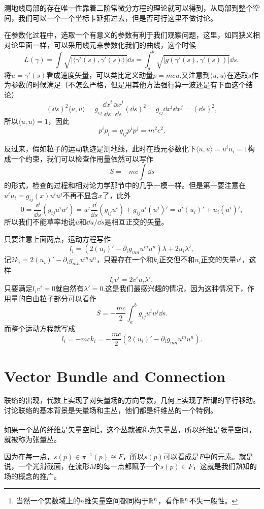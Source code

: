 测地线局部的存在唯一性靠着二阶常微分方程的理论就可以得到，从局部到整个空间，我们可以一个一个坐标卡延拓过去，但是否可行这里不做讨论。

在参数化过程中，选取一个有意义的参数有利于我们观察问题，这里，如同狭义相对论里面一样，可以采用线元来参数化我们的曲线，这个时候
\[
	L(\gamma)=\int \sqrt{|\langle\gamma'(s),\gamma'(s)\rangle|}\dd s=\int_a^b \sqrt{|g(\gamma'(s),\gamma'(s))|}\dd s,
\]
将$u=\gamma'(s)$看成速度矢量，可以类比定义动量$p=mcu$.又注意到$\langle u,u\rangle$在选取$s$作为参数的时候满足（不怎么严格，但是用其他方法强行算一波还是有下面这个结论）
\[
	(\dd s)^2\langle u, u\rangle=g_{ij}\frac{\dd x^i}{\dd s}\frac{\dd x^j}{\dd s}(\dd s)^2=g_{ij}\dd x^i\dd x^j=(\dd s)^2,
\]
所以$\langle u, u\rangle=1$，因此
\[
	p^ip_i=g_{ij}p^i p^j=m^2c^2.
\]

反过来，假如粒子的运动轨迹是测地线，此时在线元参数化下$\langle u,u\rangle=u^iu_i=1$构成一个约束，我们可以检查作用量依然可以写作
\[
	S=-mc \int \dd s
\]
的形式，检查的过程和相对论力学那节中的几乎一模一样。但是第一要注意在$u^i u_i=g_{ij}(x) u^i u^j$不再不显含$x$了，此外
\[
	0=\frac{\dd}{\dd s}\left(g_{ij}u^iu^j\right)=u^j\frac{\dd}{\dd s}\left(g_{ij}u^i\right)+g_{ij}u^i(u^j)'=u^i(u_i)'+u_i(u^i)',
\]
所以我们不能草率地说$u$和$\dd u /\dd s$是相互正交的矢量。

只要注意上面两点，运动方程写作
\[
	l_i=(2(u_i)'-\partial_ig_{mn}u^mu^n)\lambda+2u_i \lambda',
\]
记$2k_i=2(u_i)'-\partial_ig_{mn}u^mu^n$，只要存在一个和$k_i$正交但不和$u_i$正交的矢量$v^i$，这样
\[
	l_iv^i=2v^iu_i \lambda',
\]
只要满足$l_iv^i=0$就自然有$\lambda'=0$.这是我们最感兴趣的情况，因为这种情况下，作用量的自由粒子部分可以看作
\[
	S=-\frac{mc}{2}\int_a^b g_{ij}u^i u^j \dd s.
\]
而整个运动方程就写成
\[
	l_i=-mck_i=-\frac{mc}{2}\left(2(u_i)'-\partial_ig_{mn}u^mu^n\right).
\]

\section{Vector Bundle and Connection}

联络的出现，代数上实现了对矢量场的方向导数，几何上实现了所谓的平行移动。讨论联络的基本背景是矢量场和主丛，他们都是纤维丛的一个特例。

\para 如果一个丛的纤维是矢量空间\footnote{当然一个实数域上的$n$维矢量空间都同构于$\mathbb{R}^n$，看作$\mathbb{R}^n$不失一般性。}，这个丛就被称为矢量丛，所以纤维是张量空间，就被称为张量丛。

因为在每一点，$s(p)\in \pi^{-1}(p)\cong F$，所以$s(p)$可以看成是$F$中的元素。就是说，一个光滑截面，在流形$M$的每一点都赋予一个$s(p)\in F$，这就是我们熟知的场的概念的推广。

